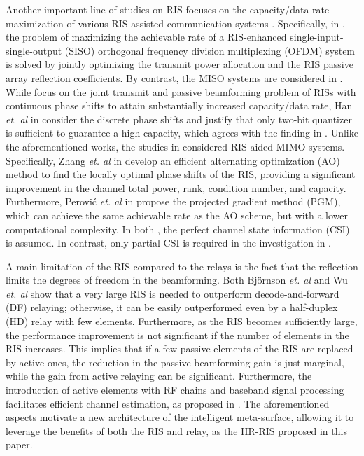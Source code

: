 \documentclass[conference]{IEEEtran}
\begin{document}
	Another important line of studies on RIS focuses on the capacity/data rate maximization of various RIS-assisted communication systems \cite{gong2020towards}. Specifically, in \cite{yang2020intelligent}, the problem of maximizing the achievable rate of a RIS-enhanced single-input-single-output (SISO)  orthogonal frequency division multiplexing (OFDM) system is solved by jointly optimizing the transmit power allocation and the RIS passive array reflection coefficients. By contrast, the MISO systems are considered in \cite{yang2019irs, yuan2020intelligent, han2019large, di2020practical}. While \cite{yang2019irs, yuan2020intelligent} focus on the joint transmit and passive beamforming problem of RISs with continuous phase shifts to attain substantially increased capacity/data rate, Han \emph{et. al} in \cite{han2019large} consider the discrete phase shifts and justify that only two-bit quantizer is sufficient to guarantee a high capacity, which agrees with the finding in \cite{di2020practical}. Unlike the aforementioned works, the studies in \cite{zhang2020capacity, perovic2021achievable, xiong2020reconfigurable} considered RIS-aided MIMO systems. Specifically, Zhang \emph{et. al} in \cite{zhang2020capacity} develop an efficient alternating optimization (AO) method to find the locally optimal phase shifts of the RIS, providing a significant improvement in the channel total power, rank, condition number, and capacity. Furthermore, Perović \emph{et. al} in \cite{perovic2021achievable} propose the projected gradient method (PGM), which can achieve the same achievable rate as the AO scheme, but with a lower computational complexity. In both \cite{zhang2020capacity, perovic2021achievable}, the perfect channel state information (CSI) is assumed. In contrast, only partial CSI is required in the investigation in \cite{xiong2020reconfigurable}.
	
	A main limitation of the RIS compared to the relays is the fact that the reflection limits the degrees of freedom in the beamforming. Both Bj\"ornson \emph{et. al} \cite{bjornson_intelligent_2019} and Wu \emph{et. al} \cite{wu2019intelligent} show that a very large RIS is needed to outperform decode-and-forward (DF) relaying; otherwise, it can be easily outperformed even by a half-duplex (HD) relay with few elements. Furthermore, as the RIS becomes sufficiently large, the performance improvement is not significant if the number of elements in the RIS increases. This implies that if a few passive elements of the RIS are replaced by active ones, the reduction in the passive beamforming gain is just marginal, while the gain from active relaying can be significant. Furthermore, the introduction of active elements with RF chains and baseband signal processing facilitates efficient channel estimation, as proposed in \cite{taha2019deep, taha2019enabling}. The aforementioned aspects motivate a new architecture of the intelligent meta-surface, allowing it to leverage the benefits of both the RIS and relay, as the HR-RIS proposed in this paper. 
	
\end{document}
